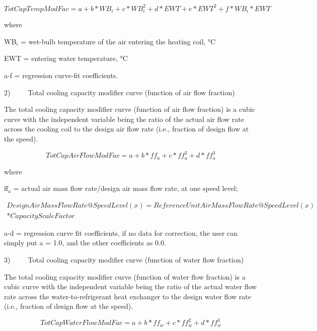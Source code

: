 \begin{equation}
TotCapTempModFac = a + b*W{B_i} + c*WB_i^2 + d*EWT + e*EW{T^2} + f*W{B_i}*EWT
\end{equation}

where

WB\(_{i}\) = wet-bulb temperature of the air entering the heating coil, °C

EWT = entering water temperature, °C

a-f = regression curve-fit coefficients.

2)~~~~~Total cooling capacity modifier curve (function of air flow fraction)

The total cooling capacity modifier curve (function of air flow fraction) is a cubic curve with the independent variable being the ratio of the actual air flow rate across the cooling coil to the design air flow rate (i.e., fraction of design flow at the speed).

\begin{equation}
TotCapAirFlowModFac = a + b*f{f_a} + c*ff_a^2 + d*ff_a^3
\end{equation}

where

ff\(_{a}\) = actual air mass flow rate/design air mass flow rate, at one speed level;

\begin{equation}
\begin{split}
  DesignAirMassFlowRate@SpeedLevel(x) = ReferenceUnitAirMassFlowRate@SpeedLevel(x) \\
  * CapacityScaleFactor
\end{split}
\end{equation}

a-d = regression curve fit coefficients, if no data for correction, the user can simply put a = 1.0, and the other coefficients as 0.0.

3)~~~~~Total cooling capacity modifier curve (function of water flow fraction)

The total cooling capacity modifier curve (function of water flow fraction) is a cubic curve with the independent variable being the ratio of the actual water flow rate across the water-to-refrigerant heat exchanger to the design water flow rate (i.e., fraction of design flow at the speed).

\begin{equation}
TotCapWaterFlowModFac = a + b*f{f_w} + c*ff_w^2 + d*ff_w^3
\end{equation}

